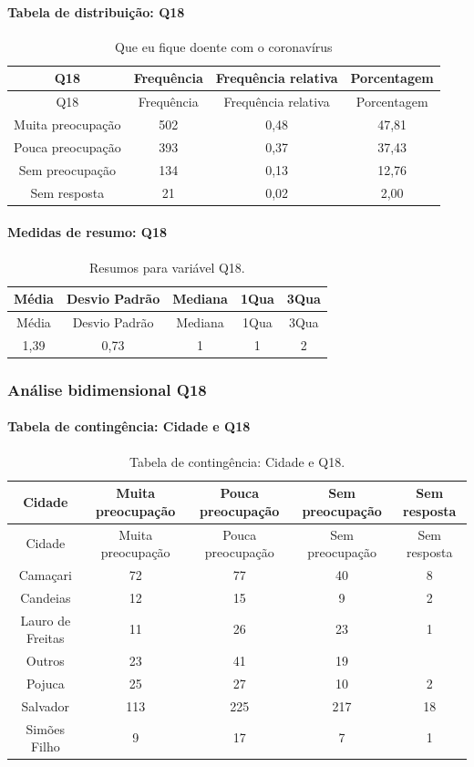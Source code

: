 \documentclass[]{article}
\let\oldparagraph\paragraph
\renewcommand{\paragraph}[1]{\oldparagraph{#1}\mbox{}}
\begin{document}
\hypertarget{tabela-de-distribuiuxe7uxe3o-q18}{%
\paragraph{Tabela de distribuição: Q18}\label{tabela-de-distribuiuxe7uxe3o-q18}}

\begin{longtable}[]{@{}cccc@{}}
\caption{\label{tab:unnamed-chunk-246}Que eu fique doente com o coronavírus}\tabularnewline
\toprule
Q18 & Frequência & Frequência relativa & Porcentagem\tabularnewline
\midrule
\endfirsthead
\toprule
Q18 & Frequência & Frequência relativa & Porcentagem\tabularnewline
\midrule
\endhead
Muita preocupação & 502 & 0,48 & 47,81\tabularnewline
Pouca preocupação & 393 & 0,37 & 37,43\tabularnewline
Sem preocupação & 134 & 0,13 & 12,76\tabularnewline
Sem resposta & 21 & 0,02 & 2,00\tabularnewline
\bottomrule
\end{longtable}

\hypertarget{medidas-de-resumo-q18}{%
\paragraph{Medidas de resumo: Q18}\label{medidas-de-resumo-q18}}

\begin{longtable}[]{@{}ccccc@{}}
\caption{\label{tab:unnamed-chunk-247}Resumos para variável Q18.}\tabularnewline
\toprule
Média & Desvio Padrão & Mediana & 1Qua & 3Qua\tabularnewline
\midrule
\endfirsthead
\toprule
Média & Desvio Padrão & Mediana & 1Qua & 3Qua\tabularnewline
\midrule
\endhead
1,39 & 0,73 & 1 & 1 & 2\tabularnewline
\bottomrule
\end{longtable}

\cleardoublepage

\hypertarget{anuxe1lise-bidimensional-q18}{%
\subsubsection{Análise bidimensional Q18}\label{anuxe1lise-bidimensional-q18}}

\hypertarget{tabela-de-continguxeancia-cidade-e-q18}{%
\paragraph{Tabela de contingência: Cidade e Q18}\label{tabela-de-continguxeancia-cidade-e-q18}}

\begin{longtable}[]{@{}ccccc@{}}
\caption{\label{tab:unnamed-chunk-248}Tabela de contingência: Cidade e Q18.}\tabularnewline
\toprule
Cidade & Muita preocupação & Pouca preocupação & Sem preocupação & Sem resposta\tabularnewline
\midrule
\endfirsthead
\toprule
Cidade & Muita preocupação & Pouca preocupação & Sem preocupação & Sem resposta\tabularnewline
\midrule
\endhead
Camaçari & 72 & 77 & 40 & 8\tabularnewline
Candeias & 12 & 15 & 9 & 2\tabularnewline
Lauro de Freitas & 11 & 26 & 23 & 1\tabularnewline
Outros & 23 & 41 & 19 &\tabularnewline
Pojuca & 25 & 27 & 10 & 2\tabularnewline
Salvador & 113 & 225 & 217 & 18\tabularnewline
Simões Filho & 9 & 17 & 7 & 1\tabularnewline
\bottomrule
\end{longtable}
\end{document}
